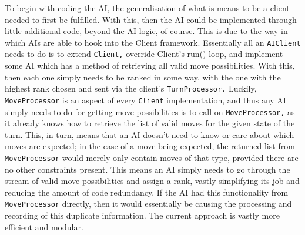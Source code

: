 \documentclass[a4paper,doc]{apa6}
\newcommand{\code}{\texttt}
\begin{document}
To begin with coding the AI, the generalisation of what is means to be a client needed to first be fulfilled. With this, then the AI could be implemented through little additional code, beyond the AI logic, of course. This is due to the way in which AIs are able to hook into the Client framework. Essentially all an \code{AIClient} needs to do is to extend \code{Client,} override Client’s run() loop, and implement some AI which has a method of retrieving all valid move possibilities.  With this, then each one simply needs to be ranked in some way, with the one with the highest rank chosen and sent via the client’s \code{TurnProcessor.} Luckily, \code{MoveProcessor} is an aspect of every \code{Client} implementation, and thus any AI simply needs to do for getting move possibilities is to call on \code{MoveProcessor,} as it already knows how to retrieve the list of valid moves for the given state of the turn. This, in turn, means that an AI doesn’t need to know or care about which moves are expected; in the case of a move being expected, the returned list from \code{MoveProcessor} would merely only contain moves of that type, provided there are no other constraints present. This means an AI simply needs to go through the stream of valid move possibilities and assign a rank, vastly simplifying its job and reducing the amount of code redundancy. If the AI had this functionality from \code{MoveProcessor} directly, then it would essentially be causing the processing and recording of this duplicate information. The current approach is vastly more efficient and modular.
\end{document}
